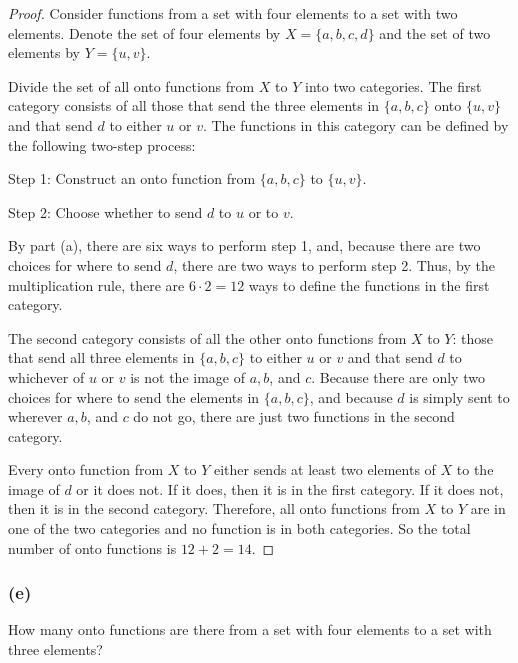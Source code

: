 \documentclass[14pt]{extarticle}
\newcommand{\cy}{\color{cyan}}
\begin{document}
\begin{proof}
Consider functions from a set with four elements to a set with two elements. Denote the set of four elements by \(X = 
\{a, b, c, d\}\) and the set of two elements by \(Y = \{u, v\}\). 

Divide the set of all onto functions from \(X\) to \(Y\) into two categories. The first category consists of all those that 
send the three elements in \(\{a, b, c\}\) onto \(\{u, v\}\) and that send \(d\) to either \(u\) or \(v\). The functions in 
this category can be defined by the following two-step process:

{\cy Step 1:} Construct an onto function from \(\{a, b, c\}\) to \(\{u, v\}\).

{\cy Step 2:} Choose whether to send \(d\) to \(u\) or to \(v\).

By part (a), there are six ways to perform step 1, and, because there are two choices for where to send \(d\), there 
are two ways to perform step 2. Thus, by the multiplication rule, there are \(6 \cdot 2 = 12\) ways to define the 
functions in the first category. 

The second category consists of all the other onto functions from \(X\) to \(Y\): those that send all three elements in 
\(\{a, b, c\}\) to either \(u\) or \(v\) and that send \(d\) to whichever of \(u\) or \(v\) is not the image of \(a, b\), 
and \(c\). Because there are only two choices for where to send the elements in \(\{a, b, c\}\), and because \(d\) is 
simply sent to wherever \(a, b\), and \(c\) do not go, there are just two functions in the second category. 

Every onto function from \(X\) to \(Y\) either sends at least two elements of \(X\) to the image of \(d\) or it does not. If 
it does, then it is in the first category. If it does not, then it is in the second category. Therefore, all onto 
functions from \(X\) to \(Y\) are in one of the two categories and no function is in both categories. So the total number of 
onto functions is \(12 + 2 = 14\).
\end{proof}

\subsubsection{(e)}
How many onto functions are there from a set with four elements to a set with three elements?
\end{document}
